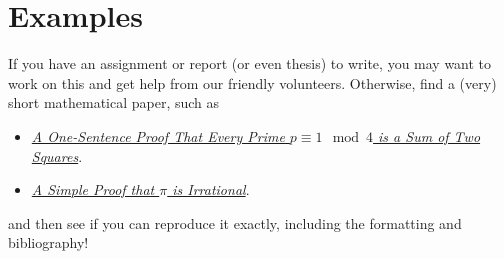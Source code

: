 \documentclass[11pt]{article}
\begin{document}
{}


\section{Examples}

If you have an assignment or report (or even thesis) to write, you may want to work on this and get help from our friendly volunteers. Otherwise, find a (very) short mathematical paper, such as
\begin{itemize}
\item \href{https://jstor.org/stable/2323918}{\textit{A One-Sentence Proof That Every Prime $p \equiv 1 \mod 4$ is a Sum of Two Squares}}.
\item  \href{https://projecteuclid.org/download/pdf_1/euclid.bams/1183510788}{\textit{A Simple Proof that $\pi$ is Irrational}}.
\end{itemize}
and then see if you can reproduce it exactly, including the formatting and bibliography!
\end{document}
